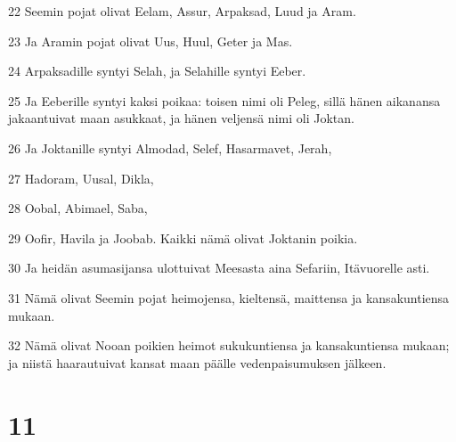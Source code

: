 \par 22 Seemin pojat olivat Eelam, Assur, Arpaksad, Luud ja Aram.
\par 23 Ja Aramin pojat olivat Uus, Huul, Geter ja Mas.
\par 24 Arpaksadille syntyi Selah, ja Selahille syntyi Eeber.
\par 25 Ja Eeberille syntyi kaksi poikaa: toisen nimi oli Peleg, sillä hänen aikanansa jakaantuivat maan asukkaat, ja hänen veljensä nimi oli Joktan.
\par 26 Ja Joktanille syntyi Almodad, Selef, Hasarmavet, Jerah,
\par 27 Hadoram, Uusal, Dikla,
\par 28 Oobal, Abimael, Saba,
\par 29 Oofir, Havila ja Joobab. Kaikki nämä olivat Joktanin poikia.
\par 30 Ja heidän asumasijansa ulottuivat Meesasta aina Sefariin, Itävuorelle asti.
\par 31 Nämä olivat Seemin pojat heimojensa, kieltensä, maittensa ja kansakuntiensa mukaan.
\par 32 Nämä olivat Nooan poikien heimot sukukuntiensa ja kansakuntiensa mukaan; ja niistä haarautuivat kansat maan päälle vedenpaisumuksen jälkeen.

\chapter{11}

